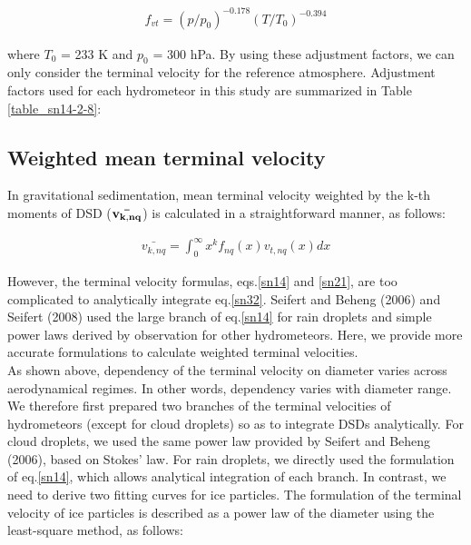 \begin{eqnarray}
f_{vt}=(p/p_{0})^{-0.178}(T/T_{0})^{-0.394}
\label{sn31}
\end{eqnarray}

where $T_{0}$ = 233 K and $p_{0}$ = 300 hPa. By using these adjustment factors, we can only consider the terminal velocity for the reference atmosphere. Adjustment factors used for each hydrometeor in this study are summarized in Table \ref{table_sn14-2-8}:

\begin{table}[h]
\begin{center}
\caption{Adjustment factor for the reference terminal velocity.}
\label{table_sn14-2-8}
\end{center}
\end{table}


\subsection{Weighted mean terminal velocity}
In gravitational sedimentation, mean terminal velocity weighted by the k-th moments of DSD (${\bf \bar{v_{k,nq}}}$) is calculated in a straightforward manner, as follows:

\begin{eqnarray}
\bar{v_{k,nq}}=\int_{0}^{\infty}x^{k}f_{nq}(x)v_{t,nq}(x)dx
\label{sn32}
\end{eqnarray}

However, the terminal velocity formulas, eqs.\ref{sn14} and \ref{sn21}, are too complicated to analytically integrate eq.\ref{sn32}. Seifert and Beheng (2006) and Seifert (2008) used the large branch of eq.\ref{sn14} for rain droplets and simple power laws derived by observation for other hydrometeors. Here, we provide more accurate formulations to calculate weighted terminal velocities.\\
As shown above, dependency of the terminal velocity on diameter varies across aerodynamical regimes. In other words, dependency varies with diameter range. We therefore first prepared two branches of the terminal velocities of hydrometeors (except for cloud droplets) so as to integrate DSDs analytically. For cloud droplets, we used the same power law provided by Seifert and Beheng (2006), based on Stokes’ law. For rain droplets, we directly used the formulation of eq.\ref{sn14}, which allows analytical integration of each branch. In contrast, we need to derive two fitting curves for ice particles. The formulation of the terminal velocity of ice particles is described as a power law of the diameter using the least-square method, as follows:

